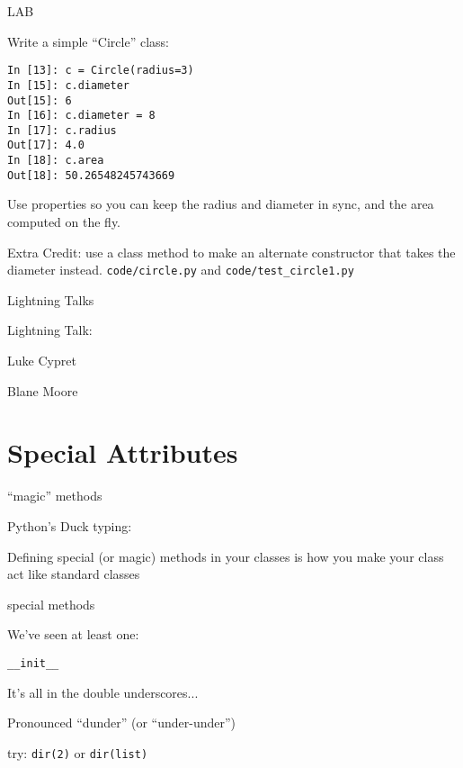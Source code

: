 \documentclass{beamer}
\begin{document}
\begin{frame}[fragile]{LAB}

{\Large Write a simple ``Circle'' class:}

\vfill
\begin{verbatim}
In [13]: c = Circle(radius=3)
In [15]: c.diameter
Out[15]: 6
In [16]: c.diameter = 8
In [17]: c.radius
Out[17]: 4.0
In [18]: c.area
Out[18]: 50.26548245743669
\end{verbatim}
Use properties so you can keep the radius and diameter in sync, and the area computed on the fly.

\vfill
Extra Credit: use a class method to make an alternate constructor that takes the diameter instead.
\vfill
{\large \verb|code/circle.py| and \verb|code/test_circle1.py|}
\end{frame}

\begin{frame}{Lightning Talks}

\vfill
{\LARGE Lightning Talk:  }

\vfill
{\Large Luke Cypret}

\vfill
{\Large Blane Moore}

\vfill

\end{frame}


\section{Special Attributes}

\begin{frame}[fragile]{``magic'' methods}

{\Large Python's Duck typing:}

\vfill
{\Large Defining special (or magic) methods in your classes is how you make
your class act like standard classes}

\end{frame} 

\begin{frame}[fragile]{special methods}

{\Large We've seen at least one:}

\vfill
{\Large \verb|__init__|}

\vfill
{\Large It's all in the double underscores...}

\vfill
{\Large Pronounced ``dunder'' (or ``under-under'') }

\vfill
{\Large try: \verb|dir(2)| or \verb|dir(list)| }

\end{frame} 
\end{document}

